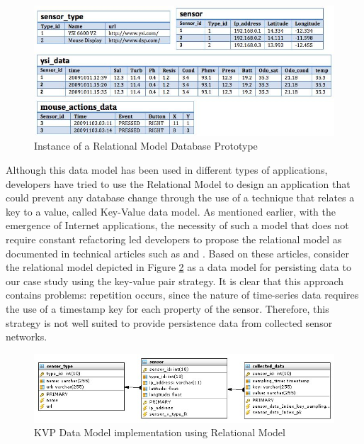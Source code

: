 \begin{figure}[!h]
  \centering
  \includegraphics[scale=0.7]{../diagrams/persistence-example-relational}
  \caption{Instance of a Relational Model Database Prototype}
  \label{fig:persistence-example-relational}
\end{figure}

Although this data model has been used in different types of applications,
developers have tried to use the Relational Model to design an application that
could prevent any database change through the use of a technique that relates a
key to a value, called Key-Value data model. As mentioned earlier, with the
emergence of Internet applications, the necessity of such a model that does
not require constant refactoring led developers to propose the relational model
as documented in technical articles such as \cite{db-kvp-in-relational01} and
\cite{db-kvp-in-relational02}. Based on these articles, consider the
relational model depicted in Figure \ref{fig:KVP-on-Relational-Model} as a
data model for persisting data to our case study using the key-value
pair strategy. It is clear that this approach contains problems: repetition
occurs, since the nature of time-series data requires the use of a timestamp
key for each property of the sensor. Therefore, this strategy is not well
suited to provide persistence data from collected sensor networks.

\begin{figure}[!h]
  \centering
  \includegraphics[scale=0.6]{../diagrams/KVP-on-Relational-Model}
  \caption{KVP Data Model implementation using Relational Model}
  \label{fig:KVP-on-Relational-Model}
\end{figure}


